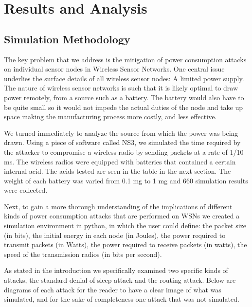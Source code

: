 \section{Results and Analysis}
\subsection{Simulation Methodology}
The key problem that we address is the mitigation of power consumption attacks on individual sensor nodes in Wireless Sensor Networks.  One central issue underlies the surface details of all wireless sensor nodes: A limited power supply. The nature of wireless sensor networks is such that it is likely optimal to draw power remotely, from a source such as a battery. The battery would also have to be quite small so it would not impede the actual duties of the node and take up space making the manufacturing process more costly, and less effective. 

We turned immediately to analyze the source from which the power was being drawn. Using a piece of software called NS3, we simulated the time required by the attacker to compromise a wireless radio by sending packets at a rate of 1/10 ms. The wireless radios were equipped with batteries that contained a certain internal acid. The acids tested are seen in the table in the next section. The weight of each battery was varied from 0.1 mg to 1 mg and 660 simulation results were collected. 

Next, to gain a more thorough understanding of the implications of different kinds of power consumption attacks that are performed on WSNs we created a simulation environment in python, in which the user could define: the packet size (in bits), the initial energy in each node (in Joules), the power required to transmit packets (in Watts), the power required to receive packets (in watts), the speed of the transmission radios (in bits per second). 

As stated in the introduction we specifically examined two specific kinds of attacks, the standard denial of sleep attack and the routing attack. Below are diagrams of each attack for the reader to have a clear image of what was simulated, and for the sake of completeness one attack that was not simulated.

